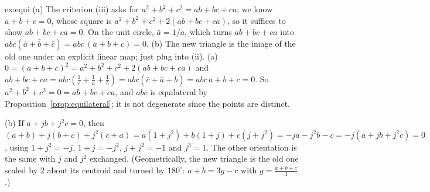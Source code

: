 \begin{solution}{ex:equi}
\idea (a) The criterion (iii) asks for $a^2+b^2+c^2=ab+bc+ca$; we know $a+b+c=0$, whose square is $a^2+b^2+c^2+2(ab+bc+ca)$, so it suffices to show $ab+bc+ca=0$. On the unit circle, $\bar a=1/a$, which turns $ab+bc+ca$ into $abc(\bar a+\bar b+\bar c)=abc\,\overline{(a+b+c)}=0$. (b) The new triangle is the image of the old one under an explicit linear map; just plug into (ii).
\writeup (a) $0=(a+b+c)^2=a^2+b^2+c^2+2(ab+bc+ca)$ and $ab+bc+ca=abc\left(\frac1c+\frac1a+\frac1b\right)=abc(\bar c+\bar a+\bar b)=abc\,\overline{a+b+c}=0$. So $a^2+b^2+c^2=0=ab+bc+ca$, and $abc$ is equilateral by Proposition~\ref{prop:equilateral}; it is not degenerate since the points are distinct.

(b) If $a+jb+j^2c=0$, then $(a+b)+j(b+c)+j^2(c+a)=a(1+j^2)+b(1+j)+c(j+j^2)=-ja-j^2b-c=-j(a+jb+j^2c)=0$, using $1+j^2=-j$, $1+j=-j^2$, $j+j^2=-1$ and $j^3=1$. The other orientation is the same with $j$ and $j^2$ exchanged. (Geometrically, the new triangle is the old one scaled by $2$ about its centroid and turned by $180^\circ$: $a+b=3g-c$ with $g=\frac{a+b+c}3$.)
\end{solution}

